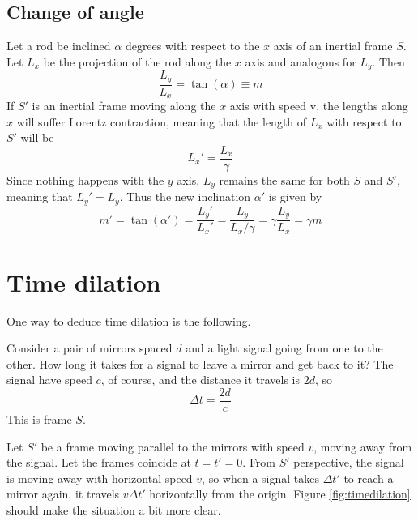 \documentclass[oneside, 10pt, notitlepage]{book}
\begin{document}
\subsection{Change of angle}

Let a rod be inclined \(\alpha\) degrees with respect to the \(x\) axis of an inertial frame \(S\). Let \(L_x\) be the projection of the rod along the \(x\) axis and analogous for \(L_y\). Then
\begin{equation}\frac{L_y}{L_x} = \tan(\alpha)\equiv m\end{equation}
If \(S{\prime}\) is an inertial frame moving along the \(x\) axis with speed v, the lengths along \(x\) will suffer Lorentz contraction, meaning that the length of \(L_x\) with respect to \(S{\prime}\) will be
\begin{equation}L_x{\prime} = \frac{L_x}{\gamma}\end{equation}
Since nothing happens with the \(y\) axis, \(L_y\) remains the same for both \(S\) and \(S{\prime}\), meaning that \(L_y{\prime} = L_y\). Thus the new inclination \(\alpha{\prime}\) is given by
\begin{equation}
m{\prime}= \tan(\alpha{\prime}) = \frac{L_y{\prime}}{L_x{\prime}} = \frac{L_y}{L_x/\gamma} = \gamma \frac{L_y}{L_x} = \gamma m\end{equation}


\section{Time dilation}

One way to deduce time dilation is the following.  

Consider a pair of mirrors spaced \(d\) and a light signal going from one to the other. How long it takes for a signal to leave a mirror and get back to it? The signal have speed \(c\), of course, and the distance it travels is \(2d\), so
\begin{equation}\label{eq:timedilationDt}
\Delta t = \frac{2d}{c}
\end{equation}
This is frame \(S\).  

Let \(S{\prime}\) be a frame moving parallel to the mirrors with speed \(v\), moving away from the signal. Let the frames coincide at \(t=t{\prime}=0 \). From \(S{\prime}\) perspective, the signal is moving away with horizontal speed \(v\), so when a signal takes \(\Delta t{\prime}\) to reach a mirror again, it travels \(v \Delta t{\prime}\) horizontally from the origin. Figure \ref{fig:timedilation} should make the situation a bit more clear.  
\end{document}
